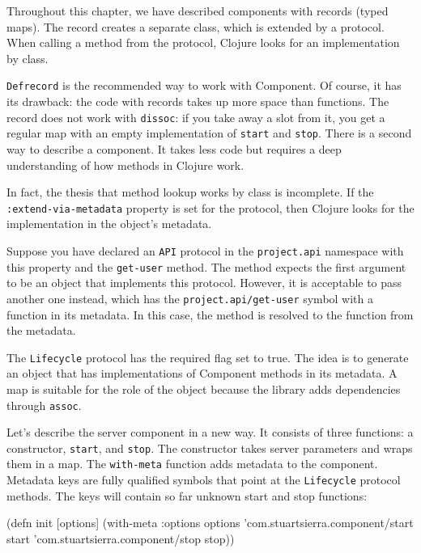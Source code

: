 Throughout this chapter, we have described components with records (typed maps). The record creates a separate class, which is extended by a protocol. When calling a method from the protocol, Clojure looks for an implementation by class.


\verb|Defrecord| is the recommended way to work with Component. Of course, it has its drawback: the code with records takes up more space than functions. The record does not work with \verb|dissoc|: if you take away a slot from it, you get a regular map with an empty implementation of \verb|start| and \verb|stop|. There is a second way to describe a component. It takes less code but requires a deep understanding of how methods in Clojure work.

In fact, the thesis that method lookup works by class is incomplete. If the \verb|:extend-via-metadata| property is set for the protocol, then Clojure looks for the implementation in the object's metadata.

Suppose you have declared an \verb|API| protocol in the \verb|project.api| namespace with this property and the \verb|get-user| method. The method expects the first argument to be an object that implements this protocol. However, it is acceptable to pass another one instead, which has the \verb|project.api/get-user| symbol with a function in its metadata. In this case, the method is resolved to the function from the metadata.

The \verb|Lifecycle| protocol has the required flag set to true. The idea is to generate an object that has implementations of Component methods in its metadata. A map is suitable for the role of the object because the library adds dependencies through \verb|assoc|.

Let's describe the server component in a new way. It consists of three functions: a constructor, \verb|start|, and \verb|stop|. The constructor takes server parameters and wraps them in a map. The \verb|with-meta| function adds metadata to the component. Metadata keys are fully qualified symbols that point at the \verb|Lifecycle| protocol methods. The keys will contain so far unknown start and stop functions:

\ifnarrow

\begin{english}
  \begin{clojure}
(defn init [options]
  (with-meta {:options options}
    {'com.stuartsierra.component/start
     start
     'com.stuartsierra.component/stop
     stop}))
  \end{clojure}
\end{english}

